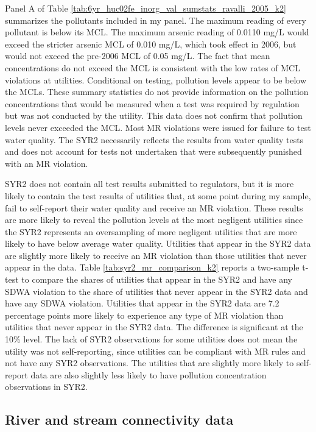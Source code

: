 \documentclass[12pt]{article}
\begin{document}
Panel A of Table \ref{tab:6yr_huc02fe_inorg_val_sumstats_ravalli_2005_k2} summarizes the pollutants included in my panel. The maximum reading of every pollutant is below its MCL. The maximum arsenic reading of 0.0110 mg/L would exceed the stricter arsenic MCL of 0.010 mg/L, which took effect in 2006, but would not exceed the pre-2006 MCL of 0.05 mg/L. The fact that mean concentrations do not exceed the MCL is consistent with the low rates of MCL violations at utilities. Conditional on testing, pollution levels appear to be below the MCLs. These summary statistics do not provide information on the pollution concentrations that would be measured when a test was required by regulation but was not conducted by the utility. This data does not confirm that pollution levels never exceeded the MCL. Most MR violations were issued for failure to test water quality. The SYR2 necessarily reflects the results from water quality tests and does not account for tests not undertaken that were subsequently punished with an MR violation. 

SYR2 does not contain all test results submitted to regulators, but it is more likely to contain the test results of utilities that, at some point during my sample, fail to self-report their water quality and receive an MR violation. These results are more likely to reveal the pollution levels at the most negligent utilities since the SYR2 represents an oversampling of more negligent utilities that are more likely to have below average water quality. Utilities that appear in the SYR2 data are slightly more likely to receive an MR violation than those utilities that never appear in the data. Table \ref{tab:syr2_mr_comparison_k2} reports a two-sample t-test to compare the shares of utilities that appear in the SYR2 and have any SDWA violation to the share of utilities that never appear in the SYR2 data and have any SDWA violation. Utilities that appear in the SYR2 data are 7.2 percentage points more likely to experience any type of MR violation than utilities that never appear in the SYR2 data. The difference is significant at the 10\% level. The lack of SYR2 observations for some utilities does not mean the utility was not self-reporting, since utilities can be compliant with MR rules and not have any SYR2 observations. The utilities that are slightly more likely to self-report data are also slightly less likely to have pollution concentration observations in SYR2.

\subsection{River and stream connectivity data}
\end{document}
